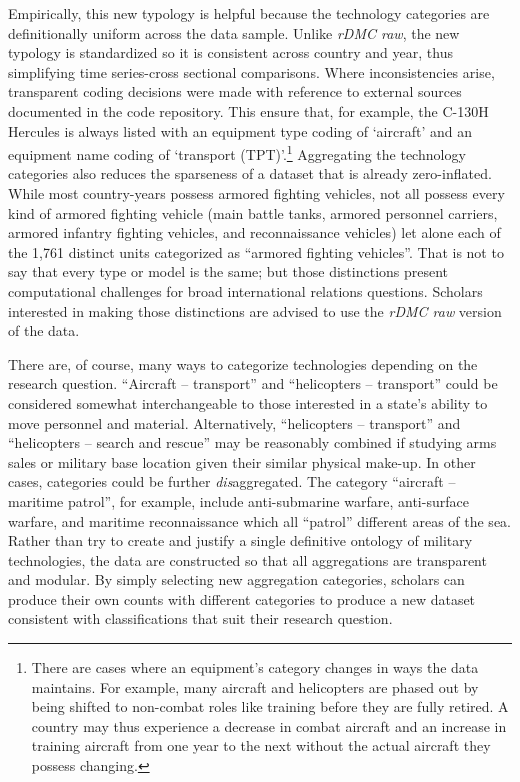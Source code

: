 \documentclass[
]{article}
\begin{document}
Empirically, this new typology is helpful because the technology categories are definitionally uniform across the data sample. Unlike \emph{rDMC raw}, the new typology is standardized so it is consistent across country and year, thus simplifying time series-cross sectional comparisons. Where inconsistencies arise, transparent coding decisions were made with reference to external sources documented in the code repository. This ensure that, for example, the C-130H Hercules is always listed with an equipment type coding of `aircraft' and an equipment name coding of `transport (TPT)'.\footnote{There are cases where an equipment's category changes in ways the data maintains. For example, many aircraft and helicopters are phased out by being shifted to non-combat roles like training before they are fully retired. A country may thus experience a decrease in combat aircraft and an increase in training aircraft from one year to the next without the actual aircraft they possess changing.} Aggregating the technology categories also reduces the sparseness of a dataset that is already zero-inflated. While most country-years possess armored fighting vehicles, not all possess every kind of armored fighting vehicle (main battle tanks, armored personnel carriers, armored infantry fighting vehicles, and reconnaissance vehicles) let alone each of the 1,761 distinct units categorized as ``armored fighting vehicles''. That is not to say that every type or model is the same; but those distinctions present computational challenges for broad international relations questions. Scholars interested in making those distinctions are advised to use the \emph{rDMC raw} version of the data.

There are, of course, many ways to categorize technologies depending on the research question. ``Aircraft -- transport'' and ``helicopters -- transport'' could be considered somewhat interchangeable to those interested in a state's ability to move personnel and material. Alternatively, ``helicopters -- transport'' and ``helicopters -- search and rescue'' may be reasonably combined if studying arms sales or military base location given their similar physical make-up. In other cases, categories could be further \emph{dis}aggregated. The category ``aircraft -- maritime patrol'', for example, include anti-submarine warfare, anti-surface warfare, and maritime reconnaissance which all ``patrol'' different areas of the sea. Rather than try to create and justify a single definitive ontology of military technologies, the data are constructed so that all aggregations are transparent and modular. By simply selecting new aggregation categories, scholars can produce their own counts with different categories to produce a new dataset consistent with classifications that suit their research question.
\end{document}
